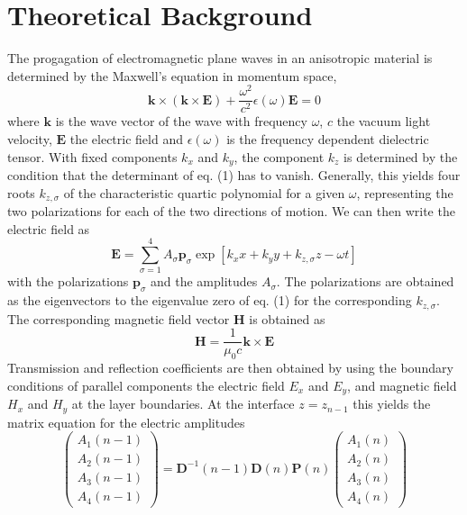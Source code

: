 \documentclass[11pt]{article}
\begin{document}
\section{Theoretical Background}
The progagation of electromagnetic plane waves in an anisotropic material is determined by the Maxwell's equation in momentum space,
\begin{equation}
 \mathbf{k}\times\left( \mathbf{k}\times \mathbf{E}\right)+\frac{\omega^2}{c^2}\epsilon(\omega)\mathbf{E}=0
\end{equation}
where $\mathbf{k}$ is the wave vector of the wave with frequency $\omega$, $c$ the vacuum light velocity, $\mathbf{E}$ the electric field and $\epsilon(\omega)$ is the frequency dependent dielectric tensor.
With fixed components $k_{x}$ and $k_{y}$, the component $k_{z}$ is determined by the condition that the determinant of eq. (1) has to vanish. Generally, this yields four roots $k_{z,\sigma}$ of the characteristic quartic polynomial for a given $\omega$, representing
the two polarizations for each of the two directions of motion. We can then write the electric field as
\begin{equation}
 \mathbf{E}=\sum_{\sigma=1}^{4}A_{\sigma}\mathbf{p}_{\sigma}\exp \left[k_xx+k_yy+k_{z,\sigma}z-\omega t \right]
\end{equation}
with the polarizations $\mathbf{p}_{\sigma}$ and the amplitudes $A_{\sigma}$. The polarizations are obtained as the eigenvectors to the eigenvalue zero of eq. (1) for the corresponding $k_{z,\sigma}$.
The corresponding magnetic field vector $\mathbf{H}$ is obtained as
\begin{equation}
\mathbf{H}=\frac{1}{\mu_0c}\mathbf{k}\times \mathbf{E}
\end{equation} 
Transmission and reflection coefficients are then obtained by using the boundary conditions of parallel components the electric field $E_x$ and $E_y$, and magnetic field $H_x$ and $H_y$ at the layer boundaries. At the interface $z=z_{n-1}$ this yields the matrix equation for the electric amplitudes
\begin{equation}
\left(\begin{array}{c}A_1(n-1)\\ A_2(n-1) \\ A_3(n-1) \\ A_4(n-1) \end{array}\right)= \mathbf{D}^{-1}(n-1)\mathbf{D}(n)\mathbf{P}(n)\left(\begin{array}{c}A_1(n)\\ A_2(n) \\ A_3(n) \\ A_4(n) \end{array}\right)

\end{equation} 
\end{document}
